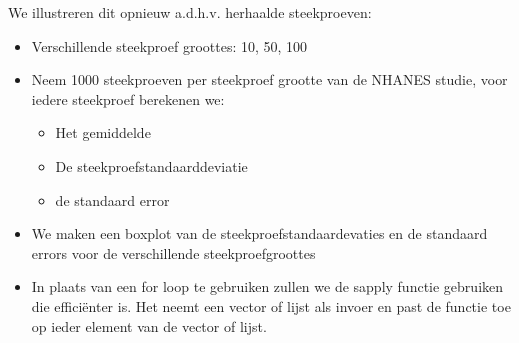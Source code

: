 \documentclass[
  12pt,dutch]{book}
\providecommand{\tightlist}{%
  \setlength{\itemsep}{0pt}\setlength{\parskip}{0pt}}
\theoremstyle{definition}
\theoremstyle{definition}
\theoremstyle{definition}
\theoremstyle{definition}
\theoremstyle{remark}
\begin{document}
We illustreren dit opnieuw a.d.h.v. herhaalde steekproeven:

\begin{itemize}
\item
  Verschillende steekproef groottes: 10, 50, 100
\item
  Neem 1000 steekproeven per steekproef grootte van de NHANES studie, voor iedere steekproef berekenen we:

  \begin{itemize}
  \tightlist
  \item
    Het gemiddelde
  \item
    De steekproefstandaarddeviatie
  \item
    de standaard error
  \end{itemize}
\item
  We maken een boxplot van de steekproefstandaardevaties en de standaard errors voor de verschillende steekproefgroottes
\item
  In plaats van een for loop te gebruiken zullen we de sapply functie gebruiken die efficiënter is. Het neemt een vector of lijst als invoer en past de functie toe op ieder element van de vector of lijst.
\end{itemize}
\end{document}
